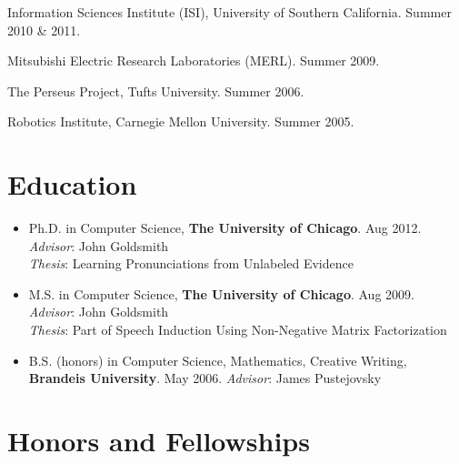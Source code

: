 \documentclass[10.5pt,letterpaper]{article}
\begin{document}
\begin{itemize*}

\item Information Sciences Institute (ISI), University of Southern California. Summer 2010 \&  2011.

\item Mitsubishi Electric Research Laboratories (MERL). Summer 2009.

\item The Perseus Project, Tufts University. Summer 2006.

\item Robotics Institute, Carnegie Mellon University. Summer 2005.

\end{itemize*}


\section*{Education}

\begin{itemize}
  \item Ph.D. in Computer Science, {\bf The University of Chicago}. Aug 2012. \\
  {\em Advisor}: John Goldsmith \\
  {\em Thesis}: Learning Pronunciations from Unlabeled Evidence
  \item M.S. in Computer Science, {\bf The University of Chicago}. Aug 2009.\\
  {\em Advisor}: John Goldsmith \\
  {\em Thesis}: Part of Speech Induction Using Non-Negative Matrix Factorization
  \item B.S. (honors) in Computer Science, Mathematics, Creative Writing,
    {\bf Brandeis University}. May 2006.
{\em Advisor}: James Pustejovsky    
\end{itemize}

\section*{Honors and Fellowships}
\end{document}
